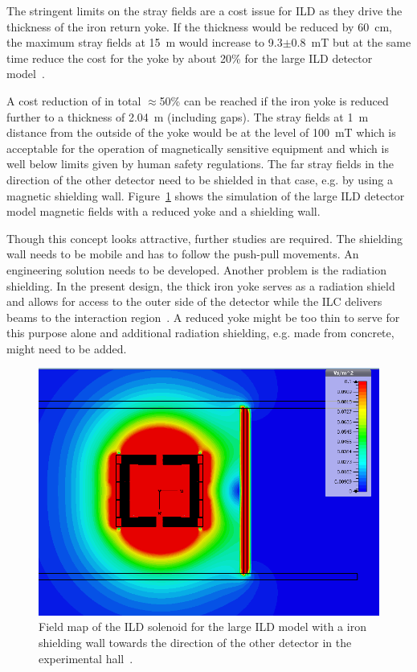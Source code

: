 The stringent limits on the stray fields are a cost issue for ILD as they drive the thickness of the iron return yoke. If the thickness would be reduced by 60~cm, the maximum stray fields at 15~m would increase to 9.3$\pm$0.8~mT but at the same time reduce the cost for the yoke by about 20\% for the large ILD detector model~\cite{ild:bib:Magnet_Simulations}.

A cost reduction of in total $\approx$50\% can be reached if the iron yoke is reduced further to a thickness of 2.04~m (including gaps). The stray fields at 1~m distance from the outside of the yoke would be at the level of 100~mT which is acceptable for the operation of magnetically sensitive equipment and which is well below limits given by human safety regulations. The far stray fields in the direction of the other detector need to be shielded in that case, e.g. by using a magnetic shielding wall. Figure~\ref{ILD:fig:magnet_wall} shows the simulation of the large ILD detector model magnetic fields with a reduced yoke and a shielding wall.

Though this concept looks attractive, further studies are required. The shielding wall needs to be mobile and has to follow the push-pull movements. An engineering solution needs to be developed. Another problem is the radiation shielding. In the present design, the thick iron yoke serves as a radiation shield and allows for access to the outer side of the detector while the ILC delivers beams to the interaction region~\cite{ild:bib:Radiation_Hall}. A reduced yoke might be too thin to serve for this purpose alone and additional radiation shielding, e.g. made from concrete, might need to be added. 
\begin{figure}[htb]
    \centering
    \includegraphics[width=0.8\hsize]{Integration/fig/magnet_wall.png}
    \caption{Field map of the ILD solenoid for the large ILD model with a iron shielding wall towards the direction of the other detector in the experimental hall~\cite{ild:bib:Magnet_Simulations}.}
    \label{ILD:fig:magnet_wall}
\end{figure}


